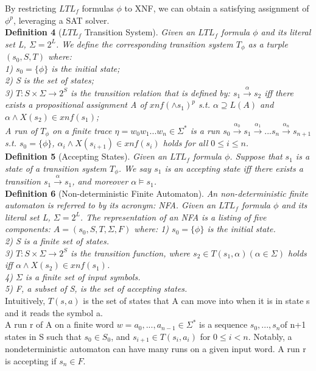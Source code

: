 By restricting $LTL_f$ formulas $\phi$ to XNF, we can obtain a satisfying assignment of $\phi^{p}$, leveraging a SAT solver.\\
{\bf Definition 4} ($LTL_f$ Transition System). {\it Given an $LTL_f$ formula $\phi$ and its literal set L, $\Sigma = 2^{L}$. We define the corresponding transition system $T_{\phi}$ as a turple $(s_0,S, T)$ where: \\
1) $s_0 = \{\phi\}$ is the initial state; \\
2) S is the set of states;\\
3) $T : S \times \Sigma \to 2^S$ is the transition relation that is defined by: $s_1\overset{\alpha}{\rightarrow} s_2$  iff there exists a propositional assignment A of $xnf(\wedge s_1)^p$ s.t. $\alpha \supseteq L(A)$ and $ \alpha \wedge X(s_2) \in xnf(s_1)$; \\
A run of $T_{\phi}$ on a finite trace $\eta = w_0w_1...w_n \in \Sigma^{*}$ is a run $s_0 \overset{\alpha_0}{\rightarrow} s_1 \overset{\alpha_1}{\rightarrow} ... s_n \overset{\alpha_n}{\rightarrow} s_{n+1} $ s.t. $s_0 = \{\phi\}$,  $\alpha_i \wedge X(s_{i+1}) \in xnf(s_i)$ holds for all $0 \leq i \leq n$.
\\}
{\bf Definition 5} (Accepting States). {\it Given an $LTL_f$ formula $\phi$. Suppose that $s_1$ is a state of a transition system $T_{\phi}$. We say  $s_1$ is an accepting state iff there exists a transition $ s_1 \overset{\alpha}{\rightarrow}s_1$, and moreover $\alpha \models s_1$. }   \\   
{\bf Definition 6} (Non-deterministic Finite Automaton). {\it An non-deterministic finite automaton is referred to by its acronym: NFA. Given an $LTL_f$ formula $\phi$ and its literal set L, $\Sigma = 2^{L}$. The representation of an NFA is a listing of five components: $A = (s_0,S, T, \Sigma, F)$ where:
1) $s_0 = \{\phi \}$ is the initial state.\\
2) S is a finite set of states.\\
3) $T:  S \times \Sigma \to 2^S$ is the transition function, where $s_2 \in T(s_1, \alpha) (\alpha \in \Sigma)$ holds iff $ \alpha \wedge X(s_2) \in xnf(s_1)$.\\
4) $\Sigma$ is a finite set of input symbols.\\
5) F, a subset of S, is the set of accepting states.\\ }
Intuitively, $T(s, a)$ is the set of states that A can move into when it is in state s and it reads the symbol a.  \\
A run r of A on a finite word $w = a_0, ..., a_{n-1} \in \Sigma^{*}$ is a sequence $s_0, ..., s_n $of n+1 states in S such that $s_0 \in S_0$, and $s_{i+1} \in T(s_i, a_i)$ for $0 \leq i < n$. Notably, a nondeterministic automaton can have many runs on a given input word. A run r is accepting if $s_n \in F$.   
